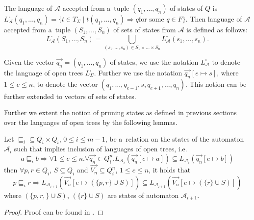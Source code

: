 The language of $\mathcal{A}$ accepted from a~tuple $(q_1,\ldots,q_n)$ of states
of $Q$ is $L^\square_\mathcal{A}(q_1,\ldots,q_n) = \{t \in T^\square_\Sigma
\mid t(q_1,\ldots,q_n) \Longrightarrow q \text{for some } q \in F\}$. Then
language of $\mathcal{A}$ accepted from a~tuple $(S_1,\ldots,S_n)$ of sets of
states from $\mathcal{A}$ is defined as
follows:
\begin{equation}
L_\mathcal{A}^\square(S_1,\ldots,S_n) = \bigcup_{(s_1,\ldots,s_n) \in
S_1\times\ldots\times S_n} L_\mathcal{A}^\square(s_1,\ldots,s_n).
\end{equation}

Given the vector $\overset{\rightarrow}{q_n} = (q_1,\ldots,q_n)$ of states, we
use the notation $L_\mathcal{A}^\square$ to denote the language of open trees
$L_\Sigma^\square$. Further we use the notation $\overset{\rightarrow}{q_n}[e
\mapsto s]$, where $1 \leq e \leq n$, to denote the vector
$(q_1,\ldots,q_{e-1}, s, q_{e+1},\ldots,q_n)$. This notion can be further
extended to vectors of sets of states.

Further we extent the notion of pruning states as defined in previous sections
over the languages of open trees by the following lemmas.

\begin{lemma}
Let $\sqsubseteq_i \subseteq Q_i \times Q_i$, $0 \leq i \leq m-1$, be a~relation
on the states of the automaton $\mathcal{A}_i$ such that implies inclusion of
languages of open trees, i.e.
\begin{equation}
 a \sqsubseteq_i b \Rightarrow \forall 1 \leq e \leq n. \forall
 \overset{\rightarrow}{q_n} \in Q_i^n.
 L_{\mathcal{A}_i}(\overset{\rightarrow}{q_n}[e \mapsto a]) \subseteq
 L_{\mathcal{A}_i}(\overset{\rightarrow}{q_n}[e \mapsto b])
\end{equation}
then $\forall p, r \in Q_i$, $S \subseteq Q_i$ and $\overset{\rightarrow}{V_n}
\subseteq Q^n_i$, $1 \leq e \leq n$, it holds that
\begin{equation}
 p \sqsubseteq_i r \Rightarrow
 L_{\mathcal{A_{i+1}}}(\overset{\rightarrow}{V_n}[e \mapsto (\{p, r\} \cup S)])
 \subseteq  L_{\mathcal{A_{i+1}}}(\overset{\rightarrow}{V_n}[e \mapsto (\{r\}
 \cup S)])
\end{equation}
where $(\{p, r,\} \cup S)$, $(\{r\} \cup S)$ are states of automaton
$\mathcal{A}_{i+1}$.
\end{lemma}

\begin{proof}
Proof can be found in \cite{tacas}.
\end{proof}

